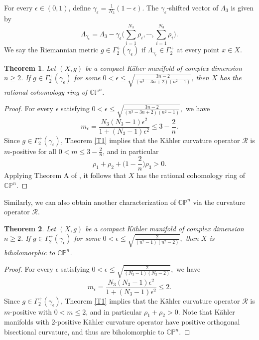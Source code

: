 \documentclass[12pt, twoside]{article}
\newtheorem{theorem}{Theorem}[section]
\theoremstyle{definition}
\numberwithin{equation}{section}
\begin{document}
For every $\epsilon\in(0,1)$, define $\gamma_{\epsilon}=\frac{1}{N_{3}}(1-\epsilon)$. The $\gamma_{\epsilon}$-shifted vector of $\Lambda_{3}$ is given by
$$\Lambda_{\gamma_{\epsilon}}=\Lambda_{3}-\gamma_{\epsilon}\Big(\sum_{i=1}^{N_{3}}\rho_{i},\cdots,\sum_{i=1}^{N_{3}}\rho_{i}\Big).$$
We say the Riemannian metric $g\in\Gamma^{+}_{2}(\gamma_{\epsilon})$ if $\Lambda_{\gamma_{\epsilon}}\in\Gamma^{+}_{2}$ at every point $x\in X$. 
\begin{theorem}
Let $(X,g)$ be a compact K\"{a}her manifold of complex dimension $n\geq 2$. If $g\in\Gamma^{+}_{2}(\gamma_{\epsilon})$ for some $0<\epsilon\leq  \sqrt{\frac{3n-2}{(n^{3}-3n+2)(n^{2}-1)}}$,  then $X$ has the rational cohomology ring of $\mathbb{CP}^{n}$.
\end{theorem}
\begin{proof}
For every $\epsilon$ satisfying $0<\epsilon\leq\sqrt{\frac{3n-2}{(n^{3}-3n+2)(n^{2}-1)}},$ we have
\[
m_{\epsilon}=\frac{N_{3}(N_3-1)\epsilon^2}{1+(N_3-1)\epsilon^2}\leq 3 - \frac{2}{n}.
\]
Since $g \in \Gamma^{+}_{2}(\gamma_{\epsilon})$, Theorem \ref{T1} implies that the K\"ahler curvature operator $\mathscr{R}$ is $m$-positive for all $0 < m \leq 3 - \frac{2}{n}$, and in particular 
\[
\rho_1+\rho_2+\Big(1-\frac{2}{n}\Big)\rho_{3}>0.
\]
Applying Theorem A of \cite{PW21b}, it follows that $X$ has the rational cohomology ring of $\mathbb{CP}^{n}$.
\end{proof}
Similarly, we can also obtain another characterization of $\mathbb{CP}^{n}$ via the curvature operator $\mathscr{R}$.
\begin{theorem}
Let $(X,g)$ be a compact K\"{a}hler manifold of complex dimension $n\geq2$. If $g\in\Gamma^{+}_{2}(\gamma_{\epsilon})$  for some
$0<\epsilon\leq\sqrt{\frac{2}{(n^2-1)(n^2-2)}},$
then $X$ is biholomorphic to $\mathbb{CP}^{n}$.
\end{theorem}
\begin{proof}
For every $\epsilon$ satisfying $0<\epsilon\leq\sqrt{\frac{2}{(N_{3}-1)(N_{3}-2)}},$  we have
\[
m_{\epsilon}=\frac{N_{3}(N_3-1)\epsilon^2}{1+(N_3-1)\epsilon^2}\leq 2.
\]
Since  $g\in\Gamma^{+}_{2}(\gamma_{\epsilon})$, Theorem \ref{T1} implies that the K\"{a}hler curvature operator  $\mathscr{R}$ is $m$-positive  with $0<m\leq2$,  and in particular $\rho_1+\rho_2>0$. Note that K\"ahler manifolds with  $2$-positive K\"ahler curvature operator have positive
orthogonal bisectional curvature, and thus are biholomorphic to $\mathbb{CP}^{n}$.
\end{proof}
\end{document}
